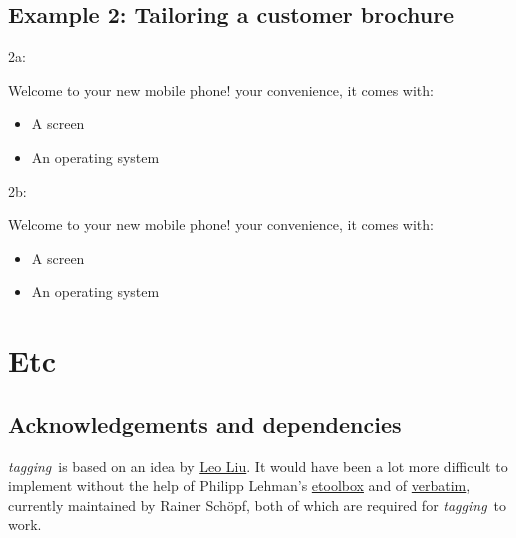 \documentclass[a4paper,12pt,twoside,openany]{memoir}
\newcommand{\tpn}{tagging}
\newcommand{\tpname}{\textsf{\itshape \tpn}}
\begin{document}
\clearpage
\section{Example 2: Tailoring a customer brochure}
\noindent 2a:
\begin{LTXexample}[pos=b]
Welcome to your new mobile phone!
 your convenience,
it comes with:
\begin{itemize}
    \item A screen
    \item An operating system
\end{itemize}
\end{LTXexample}
\vspace*{\baselineskip}
\noindent 2b:
\begin{LTXexample}[pos=b]
Welcome to your new mobile phone!
 your convenience,
it comes with:
\begin{itemize}
    \item A screen
    \item An operating system
\end{itemize}
\end{LTXexample}
\chapter{Etc}
\section{Acknowledgements and dependencies}

\tpname\ is based on an idea by \href{http://tex.stackexchange.com/users/2674/leo-liu}{Leo Liu}.
It would have been a lot more difficult to implement without the help of 
Philipp Lehman's
\href{http://www.ctan.org/tex-archive/macros/latex/contrib/etoolbox}{etoolbox}
and of
\href{http://www.ctan.org/pkg/verbatim}{verbatim}, currently maintained by
Rainer Schöpf, both of which are required for \tpname\ to work.
\end{document}
